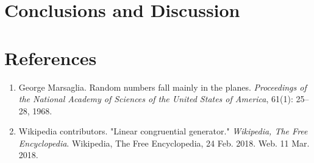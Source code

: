 \documentclass[12pt,a4paper]{article}
\begin{document}
\section{Conclusions and Discussion}
\section{References}
\begin{enumerate}
	\item George Marsaglia. Random numbers fall mainly in the planes. \textit{Proceedings of the National Academy of
		Sciences of the United States of America}, 61(1): 25–28, 1968.
	\item Wikipedia contributors. "Linear congruential generator." \textit{Wikipedia, The Free Encyclopedia}. Wikipedia, The Free Encyclopedia, 24 Feb. 2018. Web. 11 Mar. 2018.
	
	
\end{enumerate}
\end{document}
